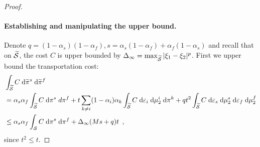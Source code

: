 \begin{proof}
    \paragraph{Establishing and manipulating the upper bound.}
    Denote $q = (1 - \alpha_s)(1 - \alpha_f), s = \alpha_s (1-\alpha_f) + \alpha_f (1 - \alpha_s)$
    and recall that on $\widetilde{\mathcal S}$, the cost $C$ is upper bounded by
    $\Delta_{\infty} = \max_{\widetilde{\mathcal S}}|\xi_1 - \xi_2|^p$.
    First we upper bound the transportation cost:
    \begin{equation}
      \label{seq:cost-split}
      \begin{split}
        &\int_{\widetilde{\mathcal S}} C \; \mathrm d\widetilde{\pi}^s \; \mathrm d\widetilde{\pi}^f \\
        &= \alpha_s\alpha_f\int_{\widetilde{\mathcal S}} C \; \mathrm d\pi^s \; d\pi^f +
        t \sum_{k \neq i} (1-\alpha_i) \alpha_k \int_{\widetilde{\mathcal S}} C \;
        \mathrm d \varepsilon_i \; \mathrm d\mu^i_2  \; \mathrm d\pi^k +
        q t^2 \int_{\widetilde{\mathcal S}} C \; \mathrm d \varepsilon_s \; \mathrm d\mu_2^s \;
        \mathrm d\varepsilon_f \; \mathrm d\mu^f_2 \\
        &\leq \alpha_s\alpha_f \int_{\mathcal S} C \; \mathrm d\pi^s \;\mathrm d\pi^f +
        \Delta_{\infty}(Ms + q)t\enspace,
      \end{split}
    \end{equation}
   since $t^2 \leq t$.


\end{proof}
